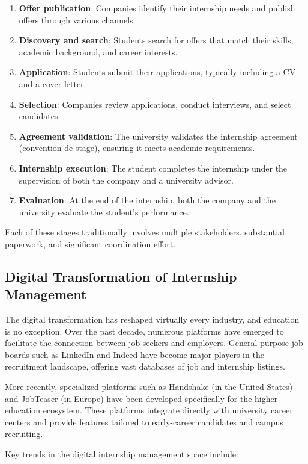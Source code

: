 \begin{enumerate}
    \item \textbf{Offer publication}: Companies identify their internship needs and publish offers through various channels.
    \item \textbf{Discovery and search}: Students search for offers that match their skills, academic background, and career interests.
    \item \textbf{Application}: Students submit their applications, typically including a CV and a cover letter.
    \item \textbf{Selection}: Companies review applications, conduct interviews, and select candidates.
    \item \textbf{Agreement validation}: The university validates the internship agreement (convention de stage), ensuring it meets academic requirements.
    \item \textbf{Internship execution}: The student completes the internship under the supervision of both the company and a university advisor.
    \item \textbf{Evaluation}: At the end of the internship, both the company and the university evaluate the student's performance.
\end{enumerate}

Each of these stages traditionally involves multiple stakeholders, substantial paperwork, and significant coordination effort.

\subsection{Digital Transformation of Internship Management}

The digital transformation has reshaped virtually every industry, and education is no exception. Over the past decade, numerous platforms have emerged to facilitate the connection between job seekers and employers. General-purpose job boards such as LinkedIn and Indeed have become major players in the recruitment landscape, offering vast databases of job and internship listings.

More recently, specialized platforms such as Handshake (in the United States) and JobTeaser (in Europe) have been developed specifically for the higher education ecosystem. These platforms integrate directly with university career centers and provide features tailored to early-career candidates and campus recruiting.

Key trends in the digital internship management space include:

